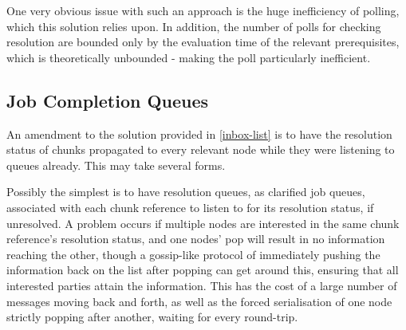 

One very obvious issue with such an approach is the huge inefficiency of
polling, which this solution relies upon.
In addition, the number of polls for checking resolution are bounded only by
the evaluation time of the relevant prerequisites, which is theoretically
unbounded - making the poll particularly inefficient.

\subsection{Job Completion Queues}





An amendment to the solution provided in \cref{inbox-list} is to have
the resolution status of chunks propagated to every relevant node while they
were listening to queues already.
This may take several forms.

Possibly the simplest is to have resolution queues, as clarified job queues,
associated with each chunk reference to listen to for its resolution status, if
unresolved.
A problem occurs if multiple nodes are interested in the same chunk reference's
resolution status, and one nodes' pop will result in no information reaching
the other, though a gossip-like protocol of immediately pushing the information
back on the list after popping can get around this, ensuring that all
interested parties attain the information.
This has the cost of a large number of messages moving back and forth, as well
as the forced serialisation of one node strictly popping after another, waiting
for every round-trip.

